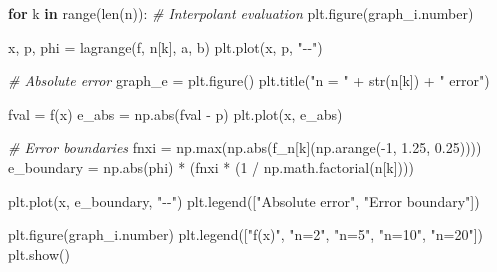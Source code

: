 \documentclass[
]{article}
\newenvironment{Shaded}{}{}
\newcommand{\BuiltInTok}[1]{\textcolor[rgb]{0.00,0.50,0.00}{#1}}
\newcommand{\CommentTok}[1]{\textcolor[rgb]{0.38,0.63,0.69}{\textit{#1}}}
\newcommand{\ControlFlowTok}[1]{\textcolor[rgb]{0.00,0.44,0.13}{\textbf{#1}}}
\newcommand{\DecValTok}[1]{\textcolor[rgb]{0.25,0.63,0.44}{#1}}
\newcommand{\FloatTok}[1]{\textcolor[rgb]{0.25,0.63,0.44}{#1}}
\newcommand{\KeywordTok}[1]{\textcolor[rgb]{0.00,0.44,0.13}{\textbf{#1}}}
\newcommand{\NormalTok}[1]{#1}
\newcommand{\OperatorTok}[1]{\textcolor[rgb]{0.40,0.40,0.40}{#1}}
\newcommand{\StringTok}[1]{\textcolor[rgb]{0.25,0.44,0.63}{#1}}
\begin{document}
\begin{Shaded}
\begin{Highlighting}[]

\ControlFlowTok{for}\NormalTok{ k }\KeywordTok{in} \BuiltInTok{range}\NormalTok{(}\BuiltInTok{len}\NormalTok{(n)):}
    \CommentTok{\# Interpolant evaluation}
\NormalTok{    plt.figure(graph\_i.number)}
    
\NormalTok{    x, p, phi }\OperatorTok{=}\NormalTok{ lagrange(f, n[k], a, b)}
\NormalTok{    plt.plot(x, p, }\StringTok{"{-}{-}"}\NormalTok{)}
    
    \CommentTok{\# Absolute error}
\NormalTok{    graph\_e }\OperatorTok{=}\NormalTok{ plt.figure()}
\NormalTok{    plt.title(}\StringTok{"n = "} \OperatorTok{+} \BuiltInTok{str}\NormalTok{(n[k]) }\OperatorTok{+} \StringTok{" error"}\NormalTok{)}
    
\NormalTok{    fval }\OperatorTok{=}\NormalTok{ f(x)}
\NormalTok{    e\_abs }\OperatorTok{=}\NormalTok{ np.}\BuiltInTok{abs}\NormalTok{(fval }\OperatorTok{{-}}\NormalTok{ p)}
\NormalTok{    plt.plot(x, e\_abs)}
    
    \CommentTok{\# Error boundaries}
\NormalTok{    fnxi }\OperatorTok{=}\NormalTok{ np.}\BuiltInTok{max}\NormalTok{(np.}\BuiltInTok{abs}\NormalTok{(f\_n[k](np.arange(}\OperatorTok{{-}}\DecValTok{1}\NormalTok{, }\FloatTok{1.25}\NormalTok{, }\FloatTok{0.25}\NormalTok{))))}
\NormalTok{    e\_boundary }\OperatorTok{=}\NormalTok{ np.}\BuiltInTok{abs}\NormalTok{(phi) }\OperatorTok{*}\NormalTok{ (fnxi }\OperatorTok{*}\NormalTok{ (}\DecValTok{1} \OperatorTok{/}\NormalTok{ np.math.factorial(n[k])))}

\NormalTok{    plt.plot(x, e\_boundary, }\StringTok{"{-}{-}"}\NormalTok{)}
\NormalTok{    plt.legend([}\StringTok{"Absolute error"}\NormalTok{, }\StringTok{"Error boundary"}\NormalTok{])}

\NormalTok{plt.figure(graph\_i.number)}
\NormalTok{plt.legend([}\StringTok{"f(x)"}\NormalTok{, }\StringTok{"n=2"}\NormalTok{, }\StringTok{"n=5"}\NormalTok{, }\StringTok{"n=10"}\NormalTok{, }\StringTok{"n=20"}\NormalTok{])}
\NormalTok{plt.show()}
\end{Highlighting}
\end{Shaded}
\end{document}
